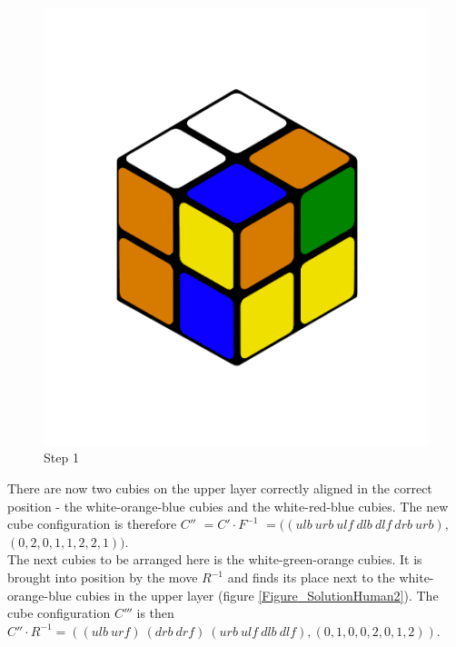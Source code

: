 \documentclass[12pt,a4paper]{article}
\theoremstyle{custom}
\begin{document}
\begin{figure}[H]
\centering
\includegraphics[scale=0.16]{images/Step1.png}
\caption{Step 1}
\label{Figure_SolutionHuman1}
\end{figure}
There are now two cubies on the upper layer correctly aligned in the correct position - the white-orange-blue cubies and the white-red-blue cubies.
The new cube configuration is therefore $C'' $ $= C' \cdot F^{-1} $ $= ((\textit{ulb} \ \textit{urb} \ \textit{ulf} \ \textit{dlb} \ \textit{dlf} \ \textit{drb} \ \textit{urb}),$ $(0,2,0,1,1,2,2,1))$.\\
The next cubies to be arranged here is the white-green-orange cubies. It is brought into position by the move $R^{-1}$ and finds its place next to the white-orange-blue cubies in the upper layer (figure \ref{Figure_SolutionHuman2}). The cube configuration $C'''$ is then $C'' \cdot R^{-1} = (( \textit{ulb} \ \textit{urf} ) \ ( \textit{drb} \ \textit{drf} ) \ ( \textit{urb} \ \textit{ulf} \ \textit{dlb} \ \textit{dlf}),(0,1,0,0,2,0,1,2))$.
 
\end{document}
